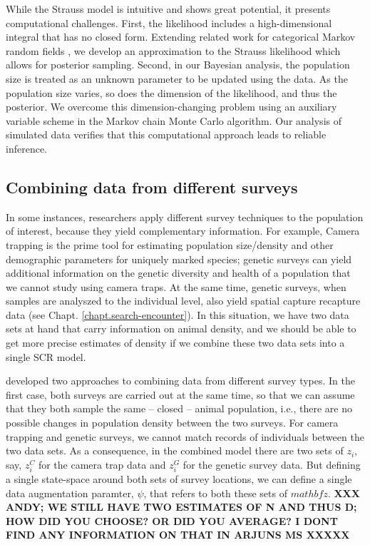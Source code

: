 While the Strauss model is intuitive and shows great potential, it
presents computational challenges.  First, the likelihood includes a
high-dimensional integral that has no closed form.  Extending related
work for categorical Markov random fields
\citep{green:2002,smith:2006}, we develop an approximation to the
Strauss likelihood which allows for posterior sampling.  Second, in
our Bayesian analysis, the population size is treated as an unknown
parameter to be updated using the data.  As the population size
varies, so does the dimension of the likelihood, and thus the
posterior.  We overcome this dimension-changing problem using an
auxiliary variable scheme in the Markov chain Monte Carlo algorithm.
Our analysis of simulated data verifies that this computational
approach leads to reliable inference.


\subsection{Combining data from different surveys}

In some instances, researchers apply different survey techniques to
the population of interest, because they yield complementary
information. For example, Camera trapping is the prime tool for
estimating population size/density and other demographic parameters
for uniquely marked species; genetic surveys can yield additional
information on the genetic diversity and health of a population that
we cannot study using camera traps. At the same time, genetic surveys,
when samples are analyszed to the individual level, also yield spatial
capture recapture data (see Chapt. \ref{chapt.search-encounter}). In
this situation, we have two data sets at hand that carry information
on animal density, and we should be able to get more precise estimates
of density if we combine these two data sets into a single SCR model.

\citet{gopalaswamy_etal:2012mee} developed two approaches to combining
data from different survey types. In the first case, both surveys are
carried out at the same time, so that we can assume that they both
sample the same -- closed -- animal population, i.e., there are no
possible changes in population density between the two surveys. For
camera trapping and genetic surveys, we cannot match records of
individuals between the two data sets. As a consequence, in the
combined model there are two sets of $z_i$, say, $z^{C}_{i}$ for the
camera trap data and $z^{G}_{i}$ for the genetic survey data. But
defining a single state-space around both sets of survey locations, we
can define a single data augmentation paramter, $\psi$, that refers to
both these sets of $mathbf{z}$.  {\bf XXX ANDY; WE STILL HAVE TWO ESTIMATES
OF N AND THUS D; HOW DID YOU CHOOSE? OR DID YOU AVERAGE? I DONT FIND
ANY INFORMATION ON THAT IN ARJUNS MS XXXXX}

